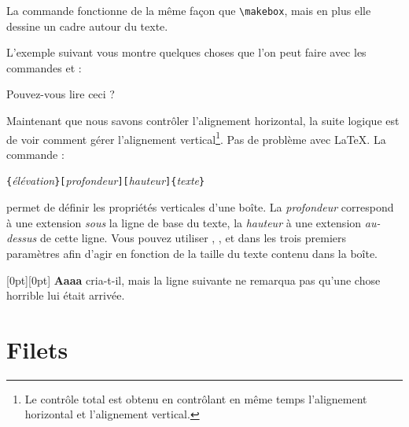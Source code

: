 La commande  fonctionne de la même façon que
\verb|\makebox|, mais en plus elle dessine un cadre autour du texte.

L'exemple suivant vous montre quelques choses que l'on peut faire avec
les commandes  et  :

\begin{example}
\par
{}\par
{} \par
{} \par
{}
Pouvez-vous lire ceci ?
\end{example}

Maintenant que nous savons contrôler l'alignement horizontal, la suite
logique est de voir comment gérer l'alignement vertical\footnote{Le
contrôle total est obtenu en contrôlant en même temps l'alignement
horizontal et l'alignement vertical.}. Pas de problème avec
\LaTeX{}. La commande :

\begin{lscommand}
\verb|{|\emph{élévation}\verb|}[|\emph{profondeur}\verb|][|\emph{hauteur}\verb|]{|\emph{texte}\verb|}|
\end{lscommand}

\noindent permet de définir les propriétés verticales d'une boîte. La
\emph{profondeur} correspond à une extension \emph{sous} la ligne de
base du texte, la \emph{hauteur} à une extension \emph{au-dessus} de
cette ligne. Vous pouvez utiliser , , 
et  dans les trois premiers paramètres afin d'agir en
fonction de la taille du texte contenu dans la boîte.

\begin{example}
\raisebox{0pt}[0pt][0pt]{\Large%
\textbf{Aaaa\raisebox{-0.3ex}{a}%
\raisebox{-0.7ex}{aa}%
\raisebox{-1.2ex}{r}%
\raisebox{-2.2ex}{g}%
\raisebox{-4.5ex}{h}}}
cria-t-il, mais la ligne suivante
ne remarqua pas qu'une chose
horrible lui était arrivée.
\end{example}

\section{Filets}
\label{sec:rule}

